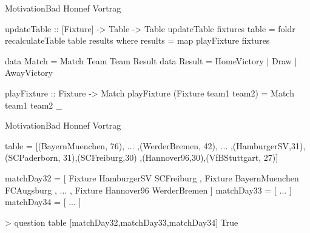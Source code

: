 \documentclass{beamer}
\begin{document}
%
%
\begin{frame}[fragile]{Motivation}{Bad Honnef Vortrag}

\begin{semiverbatim}
updateTable :: [Fixture] -> Table -> Table
updateTable fixtures table =
  foldr recalculateTable table results
 where
  results = map playFixture fixtures
\end{semiverbatim}

\begin{semiverbatim}
data Match = Match Team Team Result
data Result = HomeVictory | Draw | AwayVictory
\end{semiverbatim}

\begin{semiverbatim}
playFixture :: Fixture -> Match
playFixture (Fixture team1 team2) =
  Match team1 team2 _
\end{semiverbatim}


%
%
\begin{frame}[fragile]{Motivation}{Bad Honnef Vortrag}

\begin{semiverbatim}
table =
  [(BayernMuenchen, 76), ...
  ,(WerderBremen, 42), ...
  ,(HamburgerSV,31),(SCPaderborn, 31),(SCFreiburg,30)
  ,(Hannover96,30),(VfBStuttgart, 27)]
\end{semiverbatim}

\begin{semiverbatim}
matchDay32 =
  [ Fixture HamburgerSV SCFreiburg
  , Fixture BayernMuenchen FCAugsburg
  , ...
  , Fixture Hannover96 WerderBremen ]
matchDay33 = [ ... ]
matchDay34 = [ ... ]
\end{semiverbatim}
  
\begin{semiverbatim}
> question table [matchDay32,matchDay33,matchDay34]
True
\end{semiverbatim}
  
\end{frame}
  
\end{frame}
\end{document}
